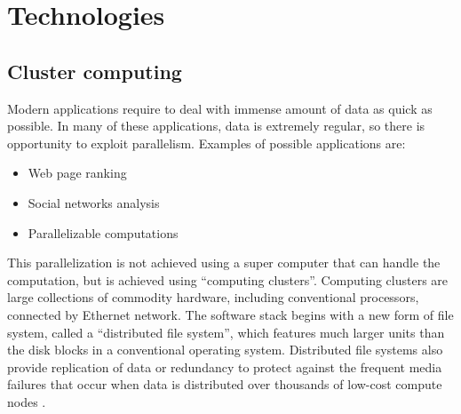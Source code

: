 \documentclass[\main/main.tex]{subfiles}
\begin{document}
\chapter{Technologies}
\section{Cluster computing}
Modern applications require to deal with immense amount of data as quick as possible. In many of these applications, data is extremely regular, so there is opportunity to exploit parallelism. Examples of possible applications are:
\begin{itemize}
    \item Web page ranking
    \item Social networks analysis
    \item Parallelizable computations
\end{itemize}
This parallelization is not achieved using a super computer that can handle the computation, but is achieved using ``computing clusters''. Computing clusters are large collections of commodity hardware, including conventional processors, connected by Ethernet network. The software stack begins with a new form of file system, called a ``distributed file system'', which features much larger units than the disk blocks in a conventional operating system. Distributed file systems also provide replication of data or redundancy to protect against the frequent media failures that occur when data is distributed over thousands of low-cost compute nodes \cite{leskovec_rajaraman_ullman_2020}.
\end{document}
